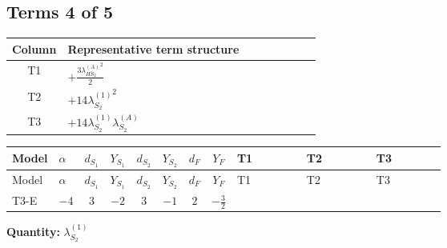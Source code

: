 \documentclass[8pt]{article}
\begin{document}
\begin{landscape}
\subsection*{Terms 4 of 5}
\begin{center}
\begin{tabular}{@{}c >{\raggedright\arraybackslash}p{0.82\linewidth}@{}}
\toprule
Column & Representative term structure \\
\midrule
T1 & \(\displaystyle +\frac{3 {\lambda_{HS_2}^{(A)}}^2}{2}\) \\
\midrule
T2 & \(\displaystyle +14 {\lambda_{S_2}^{(1)}}^2\) \\
\midrule
T3 & \(\displaystyle +14 {\lambda_{S_2}^{(1)}} {\lambda_{S_2}^{(A)}}\) \\
\midrule
\bottomrule
\end{tabular}
\end{center}
\smallskip
\tiny
\begin{longtable}{@{}llcccccc >{\raggedright\arraybackslash}p{0.21\linewidth} >{\raggedright\arraybackslash}p{0.21\linewidth} >{\raggedright\arraybackslash}p{0.21\linewidth}@{}}
\toprule
Model & $\alpha$ & $d_{S_1}$ & $Y_{S_1}$ & $d_{S_2}$ & $Y_{S_2}$ & $d_F$ & $Y_F$ & T1 & T2 & T3 \\
\midrule
\endfirsthead
\toprule
Model & $\alpha$ & $d_{S_1}$ & $Y_{S_1}$ & $d_{S_2}$ & $Y_{S_2}$ & $d_F$ & $Y_F$ & T1 & T2 & T3 \\
\midrule
\endhead
T3-E & $-4$ & $3$ & $-2$ & $3$ & $-1$ & $2$ & $-\frac{3}{2}$ & \scriptsize\adjustbox{max width=\linewidth}{$\begin{gathered} +\frac{3 {\lambda_{HS_2}^{(A)}}^2}{2}\end{gathered}$} & \scriptsize\adjustbox{max width=\linewidth}{$\begin{gathered} +14 {\lambda_{S_2}^{(1)}}^2\end{gathered}$} & \scriptsize\adjustbox{max width=\linewidth}{$\begin{gathered} +14 {\lambda_{S_2}^{(1)}} {\lambda_{S_2}^{(A)}}\end{gathered}$} \\
\midrule
\bottomrule
\end{longtable}
\clearpage
\noindent\textbf{Quantity: }$\lambda_{S_2}^{(1)}$\par\smallskip

\end{landscape}
\end{document}
